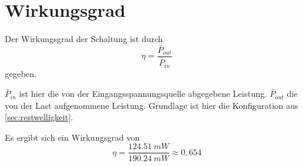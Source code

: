 	\section{Wirkungsgrad}
		Der Wirkungsgrad der Schaltung ist durch
		\begin{equation}
			\eta = \frac{\bar{P}_{out}}{\bar{P}_{in}}
			\label{eq:wirkungsgrad}
		\end{equation}
		gegeben.\par\medskip
		\(\bar{P}_{in}\) ist hier die von der Eingangsspannungsquelle abgegebene Leistung. \(\bar{P}_{out}\) die von der Last
		aufgenommene Leistung. Grundlage ist hier die Konfiguration aus \cref{sec:restwelligkeit}.\par\medskip
		Es ergibt sich ein Wirkungsgrad von
		\begin{equation}
			\eta = \frac{\SI{124,51}{mW}}{\SI{190,24}{mW}} \approx 0,654
		\end{equation}